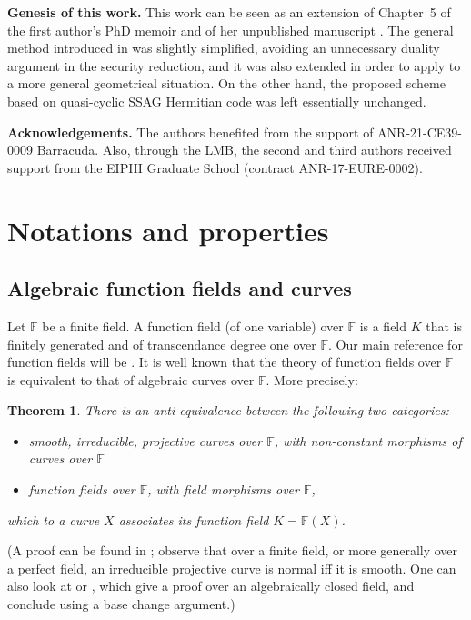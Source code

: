 \documentclass[10pt]{article}
\newtheorem{thm}{Theorem}
\theoremstyle{definition}
\theoremstyle{definition}
\theoremstyle{definition}
\newcommand{\F}{\mathbb{F}}
\begin{document}
\textbf{Genesis of this work.}
This work can be seen as an extension of Chapter~5 of the first author's PhD memoir \cite{Bar} and of her unpublished manuscript \cite{Bar2}.
The general method introduced in \cite{Bar} was slightly simplified, avoiding an unnecessary duality argument in the security reduction, and it was also extended in order to apply to a more general geometrical situation.
On the other hand, the proposed scheme based on quasi-cyclic SSAG Hermitian code was left essentially unchanged.



\textbf{Acknowledgements.}
The authors benefited from the support of ANR-21-CE39-0009 Barracuda.
Also, through the LMB, the second and third authors received support from
the EIPHI Graduate School (contract ANR-17-EURE-0002).


\section{Notations and properties}


\subsection{Algebraic function fields and curves}


Let $\F$ be a finite field. A function field (of one variable) over $\F$ is a field $K$ that is finitely generated and of transcendance degree one over $\F$.
Our main reference for function fields will be \cite{Sti}.
It is well known that the theory of function fields over $\F$ is equivalent to that of algebraic curves over $\F$. More precisely:

\begin{thm}\label{lien curve-function field}
There is an anti-equivalence between the following two categories:
\begin{itemize}
\item smooth, irreducible, projective curves over $\F$, with non-constant morphisms of curves over $\F$
\item function fields over $\F$, with field morphisms over $\F$,
\end{itemize}
which to a curve $X$ associates its function field $K=\F(X)$.
\end{thm}

(A proof can be found in \cite[Prop.~7.3.13 and Rem.~7.3.14]{Liu}; observe that over a finite field, or more generally over a perfect field, an irreducible projective curve is normal iff it is smooth.
One can also look at \cite[\S7.5]{Fulton} or \cite[Cor.~I.6.12]{Hartshorne}, which give a proof over an algebraically closed field, and conclude using a base change argument.)
\end{document}
